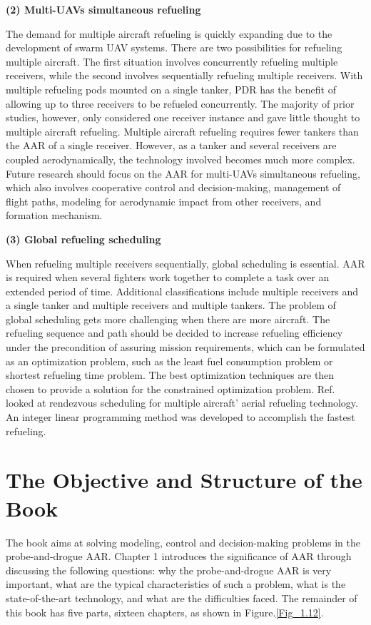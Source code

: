 \textbf{(2) Multi-UAVs simultaneous refueling }

The demand for multiple aircraft refueling is quickly expanding due
to the development of swarm UAV systems. There are two possibilities
for refueling multiple aircraft. The first situation involves concurrently
refueling multiple receivers, while the second involves sequentially
refueling multiple receivers. With multiple refueling pods mounted
on a single tanker, PDR has the benefit of allowing up to three receivers
to be refueled concurrently. The majority of prior studies, however,
only considered one receiver instance and gave little thought to multiple
aircraft refueling. Multiple aircraft refueling requires fewer tankers
than the AAR of a single receiver. However, as a tanker and several
receivers are coupled aerodynamically, the technology involved becomes
much more complex. Future research should focus on the AAR for multi-UAVs
simultaneous refueling, which also involves cooperative control and
decision-making, management of flight paths, modeling for aerodynamic
impact from other receivers, and formation mechanism. 

\textbf{(3) Global refueling scheduling }

When refueling multiple receivers sequentially, global scheduling
is essential. AAR is required when several fighters work together
to complete a task over an extended period of time. Additional classifications
include \textquotedbl multiple receivers and a single tanker\textquotedbl{}
and \textquotedbl multiple receivers and multiple tankers\textquotedbl .
The problem of global scheduling gets more challenging when there
are more aircraft. The refueling sequence and path should be decided
to increase refueling efficiency under the precondition of assuring
mission requirements, which can be formulated as an optimization problem,
such as the least fuel consumption problem or shortest refueling time
problem. The best optimization techniques are then chosen to provide
a solution for the constrained optimization problem. Ref.\cite{hao2021autonomous}
looked at rendezvous scheduling for multiple aircraft' aerial refueling
technology. An integer linear programming method was developed to
accomplish the fastest refueling. 

\section{The Objective and Structure of the Book}

The book aims at solving modeling, control and decision-making problems
in the probe-and-drogue AAR. Chapter 1 introduces the significance
of AAR through discussing the following questions: why the probe-and-drogue
AAR is very important, what are the typical characteristics of such
a problem, what is the state-of-the-art technology, and what are the
difficulties faced. The remainder of this book has five parts,
sixteen chapters, as shown in Figure.\ref{Fig_1.12}. 


